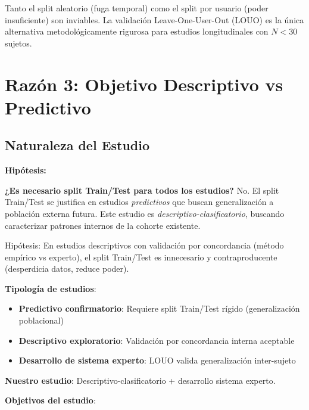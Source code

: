 \documentclass[12pt,letterpaper,twoside]{report}
\begin{document}
\begin{calculobox}
\begin{conclusionbox}
Tanto el split aleatorio (fuga temporal) como el split por usuario (poder insuficiente) son inviables. La validación Leave-One-User-Out (LOUO) es la única alternativa metodológicamente rigurosa para estudios longitudinales con $N < 30$ sujetos.
\end{conclusionbox}

\section{Razón 3: Objetivo Descriptivo vs Predictivo}

\subsection{Naturaleza del Estudio}

\begin{hipotesisbox}
\textbf{Hipótesis:}

\textbf{¿Es necesario split Train/Test para todos los estudios?} No. El split Train/Test se justifica en estudios \textit{predictivos} que buscan generalización a población externa futura. Este estudio es \textit{descriptivo-clasificatorio}, buscando caracterizar patrones internos de la cohorte existente.

Hipótesis: En estudios descriptivos con validación por concordancia (método empírico vs experto), el split Train/Test es innecesario y contraproducente (desperdicia datos, reduce poder).
\end{hipotesisbox}

\begin{estadisticobox}
\textbf{Tipología de estudios}:

\begin{itemize}[noitemsep]
    \item \textbf{Predictivo confirmatorio}: Requiere split Train/Test rígido (generalización poblacional)
    \item \textbf{Descriptivo exploratorio}: Validación por concordancia interna aceptable
    \item \textbf{Desarrollo de sistema experto}: LOUO valida generalización inter-sujeto
\end{itemize}

\textbf{Nuestro estudio}: Descriptivo-clasificatorio + desarrollo sistema experto.
\end{estadisticobox}

\begin{reglabox}
\textbf{Objetivos del estudio}:


\end{reglabox}
\end{calculobox}
\end{document}
